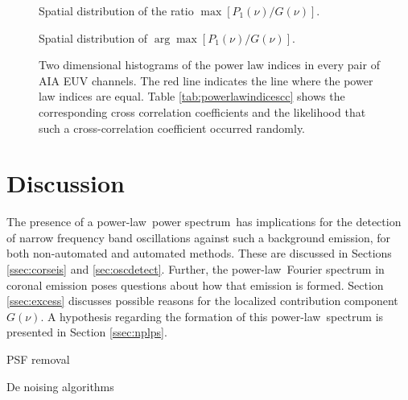 \documentclass[onecolumn]{emulateapj}
\newcommand{\PS}{power spectrum}
\newcommand{\PL}{power-law}
\begin{document}
\begin{figure}
\label{fig:spatialdistribution:gaussianamplitude}

\caption{Spatial distribution of the ratio $\max[P_{1}(\nu)/G(\nu)]$.}
\end{figure}

\begin{figure}
\label{fig:spatialdistribution:gaussianamplitude}

\caption{Spatial distribution of $\arg\max[P_{1}(\nu)/G(\nu)]$.}
\end{figure}



\begin{figure}
\label{fig:powerlawindicescc}

\caption{Two dimensional histograms of the power law indices in every
  pair of AIA EUV channels.  The red line indicates the line where the
  power law indices are equal. Table \ref{tab:powerlawindicescc} shows
the corresponding cross correlation coefficients and the likelihood
that such a cross-correlation coefficient occurred randomly.}
\end{figure}




\section{Discussion}\label{sec:discuss}
The presence of a \PL\ \PS\ has implications for the detection of
narrow frequency band oscillations against such a background emission,
for both non-automated and automated methods.  These are discussed in
Sections \ref{ssec:corseis} and \ref{sec:oscdetect}.  Further, the
\PL\ Fourier spectrum in coronal emission poses questions about how
that emission is formed.  Section \ref{ssec:excess} discusses possible
reasons for the localized contribution component $G(\nu)$.  A
hypothesis regarding the formation of this \PL\ spectrum is
presented in Section \ref{ssec:nplps}.

PSF removal

De noising algorithms



\end{document}
